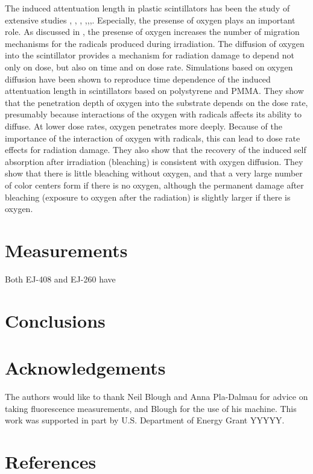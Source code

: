 \documentclass[review]{elsarticle}
\begin{document}
The induced attentuation length in plastic scintillators has been the study of extensive studies \cite{34504}, \cite{Wick1991472}, \cite{289295},
\cite{173180},\cite{467829},\cite{Wulkop1995141},\cite{173178}.  Especially, the presense of oxygen plays an important role.  As discussed 
in \cite{Wulkop1995141}, the presense of oxygen
increases the number of migration mechanisms for the radicals produced during irradiation.  The diffusion of oxygen into the scintillator
provides a mechanism for radiation damage to depend not only on dose, but also on time and on dose rate.  Simulations based on oxygen diffusion have been shown
to reproduce time dependence of the induced attentuation length in scintillators based on polystyrene and PMMA\cite{Wick1991472}.  
They show that the penetration depth of oxygen into the substrate
depends on the dose rate, presumably because interactions
of the oxygen with radicals affects its ability to diffuse.  
At lower dose rates, oxygen penetrates
more deeply.  Because of the importance of the interaction
of oxygen with radicals, this can lead to dose rate effects
for radiation damage.  They also show that the recovery of the
induced self absorption after irradiation (bleaching)
is consistent with
oxygen diffusion.  They show that there is little bleaching
without oxygen, and that a very large number of color centers
form if there is no oxygen, although the permanent damage after
bleaching (exposure to oxygen after the radiation) is slightly
larger if there is oxygen.






\section{Measurements}
Both EJ-408 and EJ-260 have 


\section{Conclusions}

\section{Acknowledgements}
The authors would like to thank Neil Blough and Anna Pla-Dalmau for advice on taking fluorescence measurements, and Blough for the use of his machine.  This work was supported in part by U.S. Department of Energy Grant YYYYY.

\section*{References}


\end{document}
